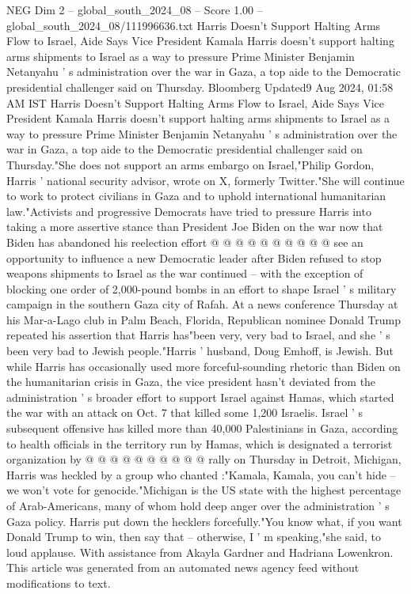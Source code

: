 \begin{textsample}{NEG Dim 2 – global\_south\_2024\_08 – Score 1.00 – global\_south\_2024\_08/111996636.txt}  \label{ex:f2_neg_429}
Harris Doesn't Support Halting Arms Flow to Israel, Aide Says Vice President Kamala Harris doesn't support halting arms shipments to Israel as a way to pressure Prime Minister Benjamin Netanyahu ' s administration over the war in Gaza, a top aide to the Democratic presidential challenger said on Thursday.
Bloomberg Updated9 Aug 2024, 01:58 AM IST Harris Doesn't Support Halting Arms Flow to Israel, Aide Says Vice President Kamala Harris doesn't support halting arms shipments to Israel as a way to pressure Prime Minister Benjamin Netanyahu ' s administration over the war in Gaza, a top aide to the Democratic presidential challenger said on Thursday."She does not support an arms embargo on Israel,"Philip Gordon, Harris ' national security advisor, wrote on X, formerly Twitter."She will continue to work to protect civilians in Gaza and to uphold international humanitarian law."Activists and progressive Democrats have tried to pressure Harris into taking a more assertive stance than President Joe Biden on the war now that Biden has abandoned his reelection effort @ @ @ @ @ @ @ @ @ @ see an opportunity to influence a new Democratic leader after Biden refused to stop weapons shipments to Israel as the war continued -- with the exception of blocking one order of 2,000-pound bombs in an effort to shape Israel ' s military campaign in the southern Gaza city of Rafah.
At a news conference Thursday at his Mar-a-Lago club in Palm Beach, Florida, Republican nominee Donald Trump repeated his assertion that Harris has"been very, very bad to Israel, and she ' s been very bad to Jewish people."Harris ' husband, Doug Emhoff, is Jewish.
But while Harris has occasionally used more forceful-sounding rhetoric than Biden on the humanitarian crisis in Gaza, the vice president hasn't deviated from the administration ' s broader effort to support Israel against Hamas, which started the war with an attack on Oct. 7 that killed some 1,200 Israelis.
Israel ' s subsequent offensive has killed more than 40,000 Palestinians in Gaza, according to health officials in the territory run by Hamas, which is designated a terrorist organization by @ @ @ @ @ @ @ @ @ @ rally on Thursday in Detroit, Michigan, Harris was heckled by a group who chanted :"Kamala, Kamala, you can't hide -- we won't vote for genocide."Michigan is the US state with the highest percentage of Arab-Americans, many of whom hold deep anger over the administration ' s Gaza policy.
Harris put down the hecklers forcefully."You know what, if you want Donald Trump to win, then say that -- otherwise, I ' m speaking,"she said, to loud applause.
With assistance from Akayla Gardner and Hadriana Lowenkron.
This article was generated from an automated news agency feed without modifications to text.

\end{textsample}

